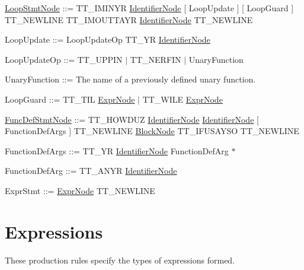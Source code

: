 \begin{DoxyParagraph}{}
\hyperlink{struct_loop_stmt_node}{Loop\-Stmt\-Node} \-:\-:= {\ttfamily T\-T\-\_\-\-I\-M\-I\-N\-Y\-R} \hyperlink{struct_identifier_node}{Identifier\-Node} \mbox{[} Loop\-Update \mbox{]} \mbox{[} Loop\-Guard \mbox{]} {\ttfamily T\-T\-\_\-\-N\-E\-W\-L\-I\-N\-E} {\ttfamily T\-T\-\_\-\-I\-M\-O\-U\-T\-T\-A\-Y\-R} \hyperlink{struct_identifier_node}{Identifier\-Node} {\ttfamily T\-T\-\_\-\-N\-E\-W\-L\-I\-N\-E} 
\end{DoxyParagraph}
\begin{DoxyParagraph}{}
Loop\-Update \-:\-:= Loop\-Update\-Op {\ttfamily T\-T\-\_\-\-Y\-R} \hyperlink{struct_identifier_node}{Identifier\-Node}
\end{DoxyParagraph}
\begin{DoxyParagraph}{}
Loop\-Update\-Op \-:\-:= {\ttfamily T\-T\-\_\-\-U\-P\-P\-I\-N} $|$ {\ttfamily T\-T\-\_\-\-N\-E\-R\-F\-I\-N} $|$ Unary\-Function
\end{DoxyParagraph}
\begin{DoxyParagraph}{}
Unary\-Function \-:\-:= The name of a previously defined unary function.
\end{DoxyParagraph}
\begin{DoxyParagraph}{}
Loop\-Guard \-:\-:= {\ttfamily T\-T\-\_\-\-T\-I\-L} \hyperlink{struct_expr_node}{Expr\-Node} $|$ {\ttfamily T\-T\-\_\-\-W\-I\-L\-E} \hyperlink{struct_expr_node}{Expr\-Node}
\end{DoxyParagraph}
\begin{DoxyParagraph}{}
\hyperlink{struct_func_def_stmt_node}{Func\-Def\-Stmt\-Node} \-:\-:= {\ttfamily T\-T\-\_\-\-H\-O\-W\-D\-U\-Z} \hyperlink{struct_identifier_node}{Identifier\-Node} \hyperlink{struct_identifier_node}{Identifier\-Node} \mbox{[} Function\-Def\-Args \mbox{]} {\ttfamily T\-T\-\_\-\-N\-E\-W\-L\-I\-N\-E} \hyperlink{struct_block_node}{Block\-Node} {\ttfamily T\-T\-\_\-\-I\-F\-U\-S\-A\-Y\-S\-O} {\ttfamily T\-T\-\_\-\-N\-E\-W\-L\-I\-N\-E} 
\end{DoxyParagraph}
\begin{DoxyParagraph}{}
Function\-Def\-Args \-:\-:= {\ttfamily T\-T\-\_\-\-Y\-R} \hyperlink{struct_identifier_node}{Identifier\-Node} Function\-Def\-Arg $\ast$
\end{DoxyParagraph}
\begin{DoxyParagraph}{}
Function\-Def\-Arg \-:\-:= {\ttfamily T\-T\-\_\-\-A\-N\-Y\-R} \hyperlink{struct_identifier_node}{Identifier\-Node}
\end{DoxyParagraph}
\begin{DoxyParagraph}{}
Expr\-Stmt \-:\-:= \hyperlink{struct_expr_node}{Expr\-Node} {\ttfamily T\-T\-\_\-\-N\-E\-W\-L\-I\-N\-E} 
\end{DoxyParagraph}
\hypertarget{lolebnf_exprebnf}{}\section{Expressions}\label{lolebnf_exprebnf}
These production rules specify the types of expressions formed.

